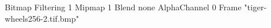 {Bitmap
	{Filtering 1}
	{Mipmap 1}
	{Blend none}
	{AlphaChannel 0}
	{Frame "tiger-wheels256-2.tif.bmp"}
}
